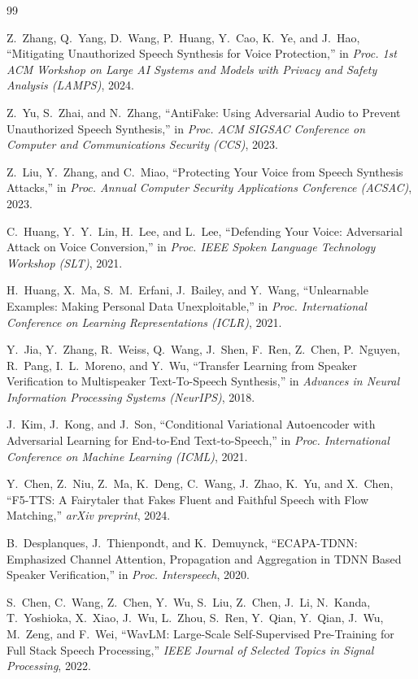 \documentclass[11pt]{article}
\begin{document}

\begin{thebibliography}{99}

Z.~Zhang, Q.~Yang, D.~Wang, P.~Huang, Y.~Cao, K.~Ye, and J.~Hao,
``Mitigating Unauthorized Speech Synthesis for Voice Protection,''
in \emph{Proc. 1st ACM Workshop on Large AI Systems and Models with
Privacy and Safety Analysis (LAMPS)}, 2024.

Z.~Yu, S.~Zhai, and N.~Zhang,
``AntiFake: Using Adversarial Audio to Prevent Unauthorized Speech
Synthesis,''
in \emph{Proc. ACM SIGSAC Conference on Computer and Communications
Security (CCS)}, 2023.

Z.~Liu, Y.~Zhang, and C.~Miao,
``Protecting Your Voice from Speech Synthesis Attacks,''
in \emph{Proc. Annual Computer Security Applications Conference
(ACSAC)}, 2023.

C.~Huang, Y.~Y.~Lin, H.~Lee, and L.~Lee,
``Defending Your Voice: Adversarial Attack on Voice Conversion,''
in \emph{Proc. IEEE Spoken Language Technology Workshop (SLT)}, 2021.

H.~Huang, X.~Ma, S.~M.~Erfani, J.~Bailey, and Y.~Wang,
``Unlearnable Examples: Making Personal Data Unexploitable,''
in \emph{Proc. International Conference on Learning Representations
(ICLR)}, 2021.

Y.~Jia, Y.~Zhang, R.~Weiss, Q.~Wang, J.~Shen, F.~Ren, Z.~Chen,
P.~Nguyen, R.~Pang, I.~L.~Moreno, and Y.~Wu,
``Transfer Learning from Speaker Verification to Multispeaker
Text-To-Speech Synthesis,''
in \emph{Advances in Neural Information Processing Systems
(NeurIPS)}, 2018.

J.~Kim, J.~Kong, and J.~Son,
``Conditional Variational Autoencoder with Adversarial Learning for
End-to-End Text-to-Speech,''
in \emph{Proc. International Conference on Machine Learning (ICML)},
2021.

Y.~Chen, Z.~Niu, Z.~Ma, K.~Deng, C.~Wang, J.~Zhao, K.~Yu, and X.~Chen,
``F5-TTS: A Fairytaler that Fakes Fluent and Faithful Speech with
Flow Matching,''
\emph{arXiv preprint}, 2024.

B.~Desplanques, J.~Thienpondt, and K.~Demuynck,
``ECAPA-TDNN: Emphasized Channel Attention, Propagation and
Aggregation in TDNN Based Speaker Verification,''
in \emph{Proc. Interspeech}, 2020.

S.~Chen, C.~Wang, Z.~Chen, Y.~Wu, S.~Liu, Z.~Chen, J.~Li, N.~Kanda,
T.~Yoshioka, X.~Xiao, J.~Wu, L.~Zhou, S.~Ren, Y.~Qian, Y.~Qian,
J.~Wu, M.~Zeng, and F.~Wei,
``WavLM: Large-Scale Self-Supervised Pre-Training for Full Stack
Speech Processing,''
\emph{IEEE Journal of Selected Topics in Signal Processing}, 2022.


\end{thebibliography}
\end{document}
